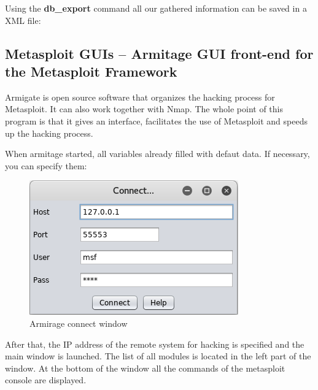 \documentclass[14pt,a4paper,report]{report}
\begin{document}


Using the \textbf{db\_export} command all our gathered information can be saved in a XML file:



\subsection{Metasploit GUIs – Armitage GUI front-end for the Metasploit Framework}

Armigate is open source software that organizes the hacking process for Metasploit. It can also work together with Nmap. The whole point of this program is that it gives an interface, facilitates the use of Metasploit and speeds up the hacking process.

When armitage started, all variables already filled with defaut data. If necessary, you can specify them:

\begin{figure}[h!]
	\centering
	\includegraphics[scale = 1.10]{images/1.png}
	\caption{Armirage connect window}
\end{figure}

\clearpage

After that, the IP address of the remote system for hacking is specified and the main window is launched. The list of all modules is located in the left part of the window. At the bottom of the window all the commands of the metasploit console are displayed.
\end{document}
